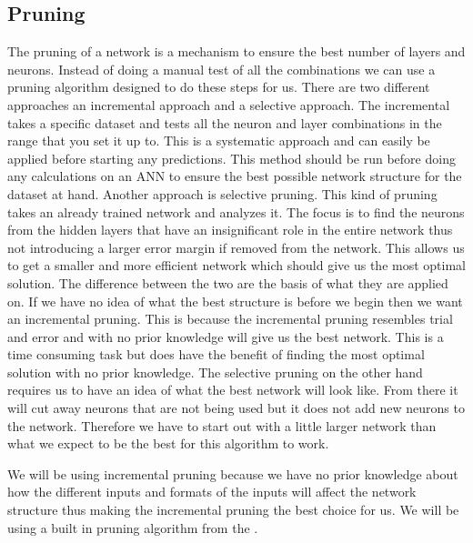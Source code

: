 \subsection{Pruning}
\label{sec:pruning}
The pruning of a network is a mechanism to ensure the best number of layers and neurons. Instead of doing a manual test of all the combinations we can use a pruning algorithm designed to do these steps for us. There are two different approaches an incremental approach and a selective approach\cite{stepniewski1997pruning}. The incremental  takes a specific dataset and tests all the neuron and layer combinations in the range that you set it up to. This is a systematic approach and can easily be applied before starting any predictions. This method should be run before doing any calculations on an ANN to ensure the best possible network structure for the dataset at hand. Another approach is selective pruning. This kind of pruning takes an already trained network and analyzes it. The focus is to find the neurons from the hidden layers that have an insignificant role in the entire network thus not introducing a larger error margin if removed from the network. This allows us to get a smaller and more efficient network which should give us the most optimal solution. The difference between the two are the basis of what they are applied on. If we have no idea of what the best structure is before we begin then we want an incremental pruning. This is because the incremental pruning resembles trial and error and with no prior knowledge will give us the best network. This is a time consuming task but does have the benefit of finding the most optimal solution with no prior knowledge. The selective pruning on the other hand requires us to have an idea of what the best network will look like. From there it will cut away neurons that are not being used but it does not add new neurons to the network. Therefore we have to start out with a little larger network than what we expect to be the best for this algorithm to work.

We will be using incremental pruning because we have no prior knowledge about how the different inputs and formats of the inputs will affect the network structure thus making the incremental pruning the best choice for us. We will be using a built in pruning algorithm from the .